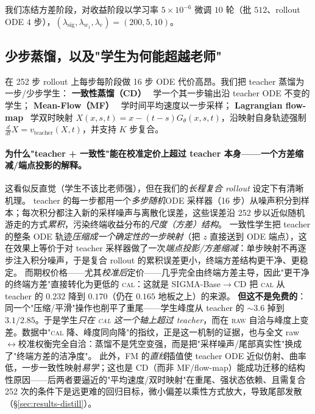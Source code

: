 \documentclass[11pt]{ctexart}
\newcommand{\raw}{\textsc{raw}}
\renewcommand{\cal}{\textsc{cal}}
\begin{document}
我们冻结方差阶段，对收益阶段以学习率 $5\!\times\!10^{-6}$ 微调 $10$ 轮（批 $512$、rollout ODE $4$ 步），$(\lambda_{\mathrm{sig}},\lambda_{w_1},\lambda_e)=(200,5,10)$。

\subsection{少步蒸馏，以及"学生为何能超越老师"}
\label{sec:distill}
在 252 步 rollout 上每步每阶段做 16 步 ODE 代价高昂。我们把 teacher 蒸馏为一步/少步学生：
\textbf{一致性蒸馏（CD）}~\citep{song2023consistency,song2024improved} 学一个其一步输出沿 teacher ODE 不变的学生；
\textbf{Mean-Flow（MF）}~\citep{geng2025meanflow} 学时间平均速度以一步采样；
\textbf{Lagrangian flow-map}~\citep{boffi2025flowmaps} 学双时映射 $X(x,s,t)=x-(t-s)G_\theta(x,s,t)$，沿映射自身轨迹强制 $\tfrac{d}{dt}X=v_{\mathrm{teacher}}(X,t)$，并支持 $K$ 步复合。

\paragraph{为什么"teacher + 一致性"能在校准定价上超过 teacher 本身——一个方差缩减/端点投影的解释。}
这看似反直觉（学生不该比老师强），但在我们的\emph{长程复合 rollout} 设定下有清晰机理。
teacher 的每一步都用一个\emph{多步随机}ODE 采样器（16 步）从噪声积分到样本；每次积分都注入新的采样噪声与离散化误差，这些误差沿 252 步以近似随机游走的方式\emph{累积}，污染终端收益分布的\emph{尺度（方差）结构}。
一致性学生把 teacher 的整条 ODE 轨迹\emph{压缩成一个确定性的一步映射}（把 $z$ 直接送到 ODE 端点），这在效果上等价于对 teacher 采样器做了一次\emph{端点投影/方差缩减}：单步映射不再逐步注入积分噪声，于是复合 rollout 的累积误差更小，终端方差结构更干净、更稳定。
而期权价格——尤其\emph{校准后}定价——几乎完全由终端方差主导，因此"更干净的终端方差"直接转化为更低的 \cal{}：这就是 SIGMA-Base$\to$CD 把 \cal{} 从 teacher 的 $0.232$ 降到 $0.170$（仍在 $0.165$ 地板之上）的来源。
\textbf{但这不是免费的}：同一个"压缩/平滑"操作也削平了重尾——学生峰度从 teacher 的 $\sim 3.6$ 掉到 $3.1/2.85$。于是学生\emph{只在 \cal{} 这一个轴上超过 teacher}，而在 \raw{} 自洽与峰度上变差。数据中"\cal{} 降、峰度同向降"的指纹，正是这一机制的证据，也与全文 raw$\leftrightarrow$校准权衡完全自洽：蒸馏不是凭空变强，而是把"采样噪声/尾部真实性"换成了"终端方差的洁净度"。
此外，FM 的\emph{直线}插值使 teacher ODE 近似仿射、曲率低，一步一致性映射\emph{易学}；这也是 CD（而非 MF/flow-map）能成功迁移的结构性原因——后两者要逼近的"平均速度/双时映射"在重尾、强状态依赖、且需复合 252 次的条件下是远更难的回归目标，微小偏差以乘性方式放大，导致尾部发散（\S\ref{sec:results-distill}）。
\end{document}

